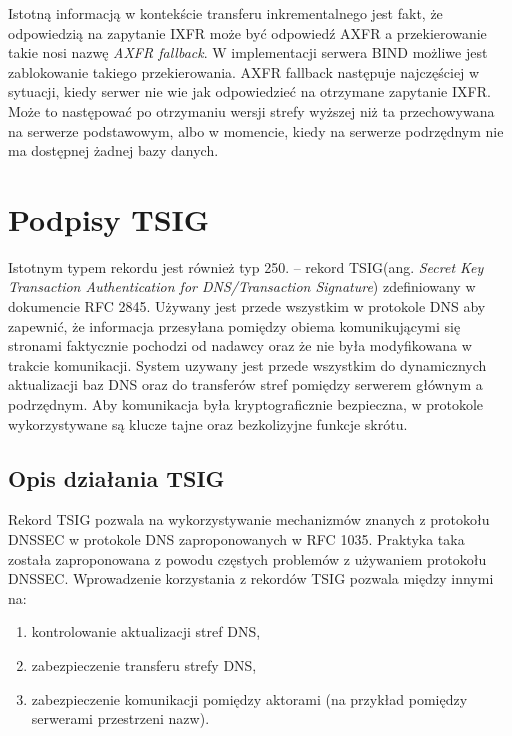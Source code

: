 Istotną informacją w kontekście transferu inkrementalnego jest fakt, że odpowiedzią na zapytanie IXFR może być odpowiedź AXFR a
przekierowanie takie nosi nazwę \textit{AXFR fallback}. W implementacji serwera BIND\cite{isc} możliwe jest zablokowanie takiego
przekierowania. AXFR fallback następuje najczęściej w sytuacji, kiedy serwer nie wie jak odpowiedzieć na otrzymane zapytanie IXFR.
Może to następować po otrzymaniu wersji strefy wyższej niż ta przechowywana na serwerze podstawowym, albo w momencie, kiedy na
serwerze podrzędnym nie ma dostępnej żadnej bazy danych\cite{I-D.song-dnsop-ixfr-fallback}.


\section{Podpisy TSIG}
\label{TSIG}
Istotnym typem rekordu jest również typ 250. -- rekord TSIG(ang. \textit{Secret Key Transaction Authentication for DNS/Transaction
Signature}) zdefiniowany w dokumencie RFC 2845\cite{RFC2845}. Używany jest przede wszystkim w protokole DNS aby zapewnić, że
informacja przesyłana pomiędzy obiema komunikującymi się stronami faktycznie pochodzi od nadawcy oraz że nie była modyfikowana w
trakcie komunikacji. System uzywany jest przede wszystkim do dynamicznych aktualizacji baz DNS oraz do transferów stref pomiędzy
serwerem głównym a podrzędnym. Aby komunikacja była kryptograficznie bezpieczna, w protokole wykorzystywane są klucze tajne oraz
bezkolizyjne funkcje skrótu.

\subsection{Opis działania TSIG}
\label{tsig}
Rekord TSIG pozwala na wykorzystywanie mechanizmów znanych z protokołu DNSSEC\cite{nask-tsig} w protokole DNS zaproponowanych w
RFC 1035\cite{RFC1035}. Praktyka taka została zaproponowana z powodu częstych problemów z używaniem protokołu
DNSSEC\cite{RFC4033, RFC4035}. Wprowadzenie korzystania z rekordów TSIG pozwala między innymi na:
\begin{enumerate}
	\item kontrolowanie aktualizacji stref DNS,
	\item zabezpieczenie transferu strefy DNS,
	\item zabezpieczenie komunikacji pomiędzy aktorami (na przykład pomiędzy serwerami przestrzeni nazw).
\end{enumerate}

